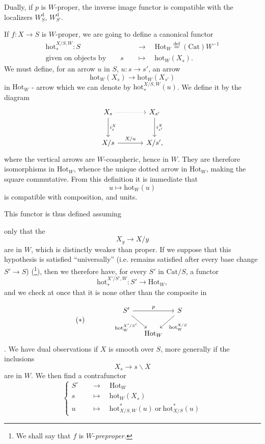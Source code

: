 \documentclass[11pt]{article}
\newcommand{\printedpage}[1]{\marginpar{\footnotesize p.~#1}}
\newcommand{\msp}[1]{\marginpar{\footnotesize [#1]}}
\newcommand{\Cat}{\mathrm{Cat}}
\newcommand{\Hot}{\mathrm{Hot}}
\newcommand{\hot}{\mathrm{hot}}
\begin{document}
\leavevmode\msp{page 33}Dually, if $p$ is $W$-proper, the inverse image functor is compatible with the localizers $W^{\mathrm{d}}_S$, $W^{\mathrm{d}}_{S'}$.

If $f : X\longrightarrow S$ is $W$-proper, we are going to define a canonical functor
\[
\begin{aligned}
\hot_*^{X/S,W} : S &\quad\longrightarrow\quad \Hot_W\overset{\text{def}}{=}(\Cat)W^{-1}\\
\text{given on objects by}\qquad s &\quad\longmapsto\quad \hot_W(X_s).
\end{aligned}
\]
We must define, for an arrow $u$ in $S$, $u : s\longrightarrow s'$, an arrow
\[
\hot_W(X_s)\longrightarrow\hot_W(X_{s'})
\]
in $\Hot_W$ - arrow which we can denote by $\hot_*^{X/S,W}(u)$. We define it by the diagram
\[
\begin{tikzcd}[row sep=large, column sep=large]
X_s \arrow[r, dotted] \arrow[d, "i_s^X"] & X_{s'} \arrow[d, "i_{s'}^X"] \\
X/s \arrow[r, "X/u"] & X/s',
\end{tikzcd}
\]
where the vertical arrows are $W$-coaspheric, hence in $W$. They are therefore isomorphisms in $\Hot_W$, whence the unique dotted arrow in $\Hot_W$, making the square commutative. From this definition it is immediate that
\[
u\longmapsto\hot_W(u)
\]
is compatible with composition, and units.

This functor is thus defined assuming

\leavevmode\msp{page 34}only that the
\[
X_y\longrightarrow X/y
\]
are in $W$, which is distinctly weaker than proper. If we suppose that this hypothesis is satisfied ``universally'' (i.e. remains satisfied after every base change $S'\longrightarrow S$) (\footnote[45]{We shall say that $f$ is $W$-\textit{preproper.}}), then we therefore have, for every $S'$ in $\Cat/S$, a functor
\[
\hot_*^{X'/S',W} : S'\longrightarrow\Hot_W,
\]
and we check at once that it is none other than the composite in

\printedpage{27}
\[
(*)\qquad\qquad
\begin{tikzcd}[column sep=small]
S' \arrow[rr, "p"] \arrow[dr, "\hot_W^{X'/S'}"'] & & S \arrow[dl, "\hot_W^{X/S}"] \\
& \Hot_W &
\end{tikzcd}
\]
. We have dual observations if $X$ is smooth over $S$, more generally if the inclusions
\[
X_s\longrightarrow s\backslash X
\]
are in $W$. We then find a contrafunctor
\[
\left\{
\begin{aligned}
S^\circ &\quad\longrightarrow\quad \Hot_W\\
s &\quad\longmapsto\quad \hot_W(X_s)\\
u &\quad\longmapsto\quad \hot^*_{X/S,W}(u)\ \text{or}\ \hot^*_{X/S}(u)
\end{aligned}
\right.
\]
\end{document}
